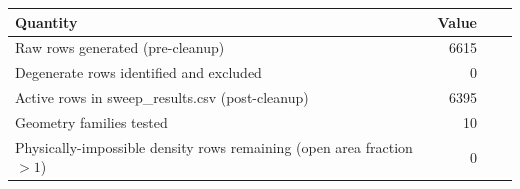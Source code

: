 \begin{tabular}{lrrr}
\toprule
Quantity & Value \\
\midrule
Raw rows generated (pre-cleanup) & 6615 \\
Degenerate rows identified and excluded & 0 \\
Active rows in sweep\_results.csv (post-cleanup) & 6395 \\
Geometry families tested & 10 \\
Physically-impossible density rows remaining (open area fraction $>1$) & 0 \\
\bottomrule
\end{tabular}

